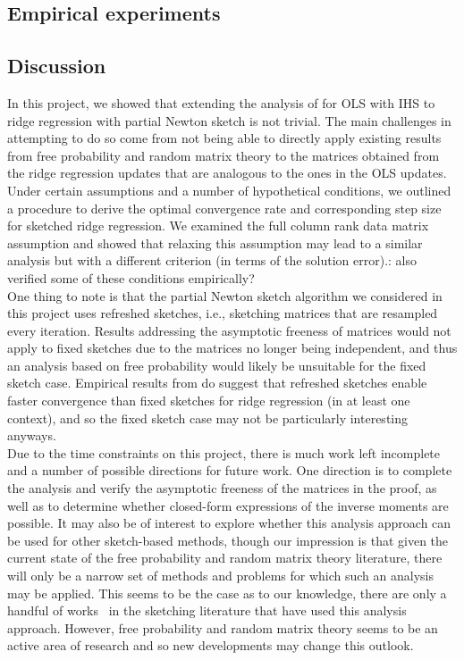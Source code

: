 \subsection{Empirical experiments} \label{sec:empirical}


\subsection{Discussion} \label{sec:conclusion}

In this project, we showed that extending the analysis of \citet{Lacotte:2020} for OLS with IHS to ridge regression with partial Newton sketch is not trivial. The main challenges in attempting to do so come from not being able to directly apply existing results from free probability and random matrix theory to the matrices obtained from the ridge regression updates that are analogous to the ones in the OLS updates. Under certain assumptions and a number of hypothetical conditions, we outlined a procedure to derive the optimal convergence rate and corresponding step size for sketched ridge regression. We examined the full column rank data matrix assumption and showed that relaxing this assumption may lead to a similar analysis but with a different criterion (in terms of the solution error).\todo: also verified some of these conditions empirically?
\\

One thing to note is that the partial Newton sketch algorithm we considered in this project uses refreshed sketches, i.e., sketching matrices that are resampled every iteration. Results addressing the asymptotic freeness of matrices would not apply to fixed sketches due to the matrices no longer being independent, and thus an analysis based on free probability would likely be unsuitable for the fixed sketch case. Empirical results from \citet{Chowdhury:2018} do suggest that refreshed sketches enable faster convergence than fixed sketches for ridge regression (in at least one context), and so the fixed sketch case may not be particularly interesting anyways.
\\

Due to the time constraints on this project, there is much work left incomplete and a number of possible directions for future work. One direction is to complete the analysis and verify the asymptotic freeness of the matrices in the proof, as well as to determine whether closed-form expressions of the inverse moments are possible. It may also be of interest to explore whether this analysis approach can be used for other sketch-based methods, though our impression is that given the current state of the free probability and random matrix theory literature, there will only be a narrow set of methods and problems for which such an analysis may be applied. This seems to be the case as to our knowledge, there are only a handful of works~\citep{Dobriban:2019,Lacotte:2020,Lacotte:2020b} in the sketching literature that have used this analysis approach. However, free probability and random matrix theory seems to be an active area of research and so new developments may change this outlook.
